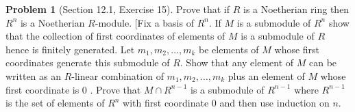 \documentclass{amsart}
\numberwithin{equation}{section}
\theoremstyle{definition}
\newtheorem{problem}[thm]{Problem}
\begin{document}
\begin{problem}[Section 12.1, Exercise 15]
Prove that if \(R\) is a Noetherian ring then \(R^n\) is a Noetherian \(R\)-module. [Fix a basis of \(R^n\). If \(M\) is a submodule of \(R^n\) show that the collection of first coordinates of elements of \(M\) is a submodule of \(R\) hence is finitely generated. Let \(m_1, m_2, \ldots, m_k\) be elements of \(M\)
whose first coordinates generate this submodule of \(R\). Show that any element of \(M\) can be written as an \(R\)-linear combination of \(m_1, m_2, \ldots, m_k\) plus an element of \(M\) whose first coordinate is 0 . Prove that \(M \cap R^{n-1}\) is a submodule of \(R^{n-1}\) where \(R^{n-1}\) is the set of elements of \(R^n\) with first coordinate 0 and then use induction on \(n\).
\end{problem}






\end{document}
